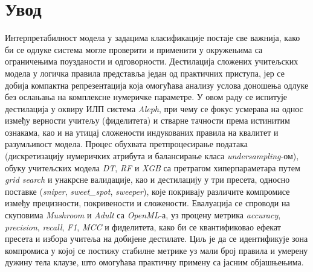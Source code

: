 \section{Увод}
Интерпретабилност модела у задацима класификације постаје све важнија, како би се одлуке система могле проверити и применити у окружењима са ограничењима поузданости и одговорности. Дестилација сложених учитељских модела у логичка правила представља један од практичних приступа, јер се добија компактна репрезентација која омогућава анализу услова доношења одлуке без ослањања на комплексне нумеричке параметре. У овом раду се испитује дестилација у оквиру ИЛП система \emph{Aleph}, при чему се фокус усмерава на однос између верности учитељу (фиделитета) и стварне тачности према истинитим ознакама, као и на утицај сложености индукованих правила на квалитет и разумљивост модела. Процес обухвата претпроцесирање података (дискретизацију нумеричких атрибута и балансирање класа \emph{undersampling}-ом), обуку учитељских модела \emph{DT}, \emph{RF} и \emph{XGB} са претрагом хиперпараметара путем \emph{grid search} и унакрсне валидације, као и дестилацију у три пресета, односно поставке (\textit{sniper}, \textit{sweet\_spot}, \textit{sweeper}), које покривају различите компромисе између прецизности, покривености и сложености. Евалуација се спроводи на скуповима \emph{Mushroom} и \emph{Adult} са \emph{OpenML}-а, уз процену метрика \emph{accuracy}, \emph{precision}, \emph{recall}, \emph{F1}, \emph{MCC} и фиделитета, како би се квантификовао ефекат пресета и избора учитеља на добијене дестилате. Циљ је да се идентификује зона компромиса у којој се постижу стабилне метрике уз мали број правила и умерену дужину тела клаузе, што омогућава практичну примену са јасним објашњењима.